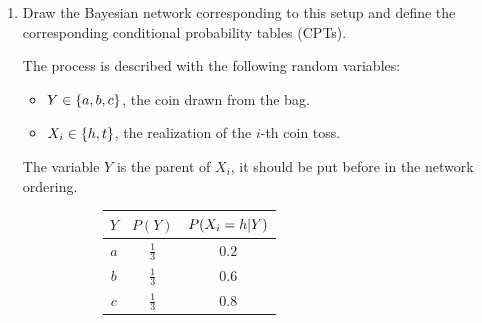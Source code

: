 \documentclass[11pt, a4paper]{article}
\begin{document}
\begin{enumerate}
    \item Draw the Bayesian network corresponding to this setup and define the corresponding conditional probability tables (CPTs).

    \begin{solution}
        The process is described with the following random variables:
        \begin{itemize}
            \item $Y \in \{a, b, c\}$, the coin drawn from the bag.
            \item $X_i \in \{h, t\}$, the realization of the $i$-th coin toss.
        \end{itemize}
        The variable $Y$ is the parent of $X_i$, it should be put before in the network ordering.

        \begin{figure}[h]
            \begin{subfigure}[c]{0.495\textwidth}
                \centering
            \end{subfigure}
            \begin{subfigure}[c]{0.495\textwidth}
                \centering
                \begin{tabular}{c|cc}
                    \toprule
                     $Y$ & $P(Y)$ & $P(X_i = h \vert Y)$ \\
                     \midrule
                     $a$ & $\frac{1}{3}$ & $0.2$ \\
                     $b$ & $\frac{1}{3}$ & $0.6$ \\
                     $c$ & $\frac{1}{3}$ & $0.8$ \\
                    \bottomrule
                \end{tabular}
            \end{subfigure}
        \end{figure}
    \end{solution}


\end{enumerate}
\end{document}
